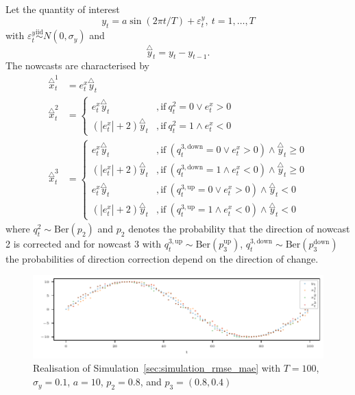 \documentclass[oneside]{article}
\theoremstyle{plain}%
\theoremstyle{definition}
\newcommand{\ydiff}{\overset{\triangle}{y}}
\newcommand{\xdiff}{\overset{\triangle}{x}}
\begin{document}
Let the quantity of interest 
\begin{equation}
  y_t = a \sin(2 \pi t / T) + \varepsilon_t^y, \ t = 1, \dots, T
\end{equation}
with $\varepsilon_t^y \stackrel{\text{iid}}{\sim} N(0, \sigma_y)$ and 
\begin{equation}
  \ydiff_t = y_t - y_{t-1}.
\end{equation}
The nowcasts are characterised by 
\begin{align}
	\xdiff_t^1 &= e^x_t \ydiff_t \\
	\xdiff_t^2 &= \begin{cases}
		e^x_t \ydiff_t &, \text{if}\ q^2_t = 0 \lor e^x_t > 0\\
		(| e^x_t | + 2) \ydiff_t &, \text{if}\ q^2_t = 1 \land e^x_t < 0
	\end{cases} \\
	\xdiff_t^3 &= \begin{cases}
		e^x_t \ydiff_t &, \text{if}\ (q^{3, \text{down}}_t = 0 \lor e^x_t > 0) \land \ydiff_t \geq 0\\
		(| e^x_t | + 2) \ydiff_t &, \text{if}\ (q^{3, \text{down}}_t = 1 \land e^x_t < 0) \land \ydiff_t \geq 0 \\
		e^x_t \ydiff_t &, \text{if}\ (q^{3, \text{up}}_t = 0 \lor e^x_t > 0) \land \ydiff_t < 0\\
		(| e^x_t | + 2) \ydiff_t &, \text{if}\ (q^{3, \text{up}}_t = 1 \land e^x_t < 0) \land \ydiff_t < 0
	\end{cases}
\end{align}
where $q^2_t \sim \text{Ber}(p_2)$ and $p_2$ denotes the probability that the direction of nowcast 2 is corrected and for nowcast 3 with $q^{3, \text{up}}_t \sim \text{Ber}(p_3^{\text{up}})$, $q^{3, \text{down}}_t \sim \text{Ber}(p_3^{\text{down}})$ the probabilities of direction correction depend on the direction of change.

\begin{figure}
  \centering
  \includegraphics{plots/simulation_same_rmse_mae/time_series.pdf}
  \caption{Realisation of Simulation~\ref{sec:simulation_rmse_mae} with $T = 100$, $\sigma_y=0.1$, $a = 10$, $p_2 = 0.8$, and $p_3 = (0.8, 0.4)$}
  \label{fig:simulation_rmse_mae_ts}
\end{figure}
\end{document}

